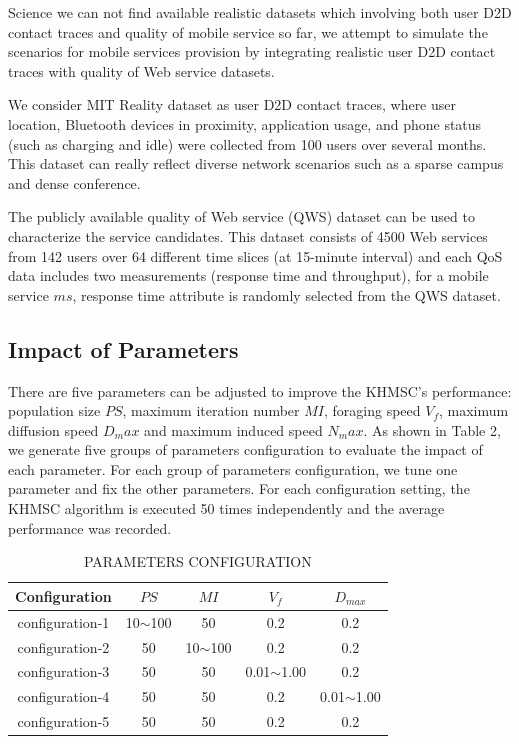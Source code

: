 \documentclass[10pt,journal,compsoc]{IEEEtran}
\begin{document}
Science we can not find available realistic datasets which involving both user D2D contact traces and quality of mobile service so far, we attempt to simulate the scenarios for mobile services provision by integrating realistic user D2D contact traces with quality of Web service datasets. 

We consider MIT Reality dataset as user D2D contact traces, where user location, Bluetooth devices in proximity, application usage, and phone status (such as charging and idle) were collected from 100 users over several months. This dataset can really reflect diverse network scenarios such as a sparse campus and dense conference.

The publicly available quality of Web service (QWS) dataset\cite{zheng2014investigating} can be used to characterize the service candidates. This dataset consists of 4500 Web services from 142 users over 64 different time slices (at 15-minute interval) and each QoS data includes two measurements (response time and throughput), for a mobile service $ms$, response time attribute is randomly selected from the QWS dataset. 

\subsection{Impact of Parameters}
There are five parameters can be adjusted to improve the KHMSC's performance: population size $PS$, maximum iteration number $MI$, foraging speed $V_f$, maximum diffusion speed $D_max$ and maximum induced speed $N_max$. As shown in Table 2, we generate five groups of parameters configuration to evaluate the impact of each parameter. For each group of parameters configuration, we tune one parameter and fix the other parameters. For each configuration setting, the KHMSC algorithm is executed 50 times independently and the average performance was recorded.

\begin{table}[!t]
\renewcommand{\arraystretch}{1.3}
\caption{PARAMETERS CONFIGURATION}
\label{table_example}
\centering
\begin{tabular}{ccccc}
\hline
\bfseries Configuration & \bfseries $PS$ & \bfseries $MI$ & \bfseries $V_f$ & \bfseries $D_{max}$  \\
\hline
configuration-1 & 10$\sim$100 & 50          & 0.2            & 0.2            \\
configuration-2 & 50          & 10$\sim$100 & 0.2            & 0.2            \\
configuration-3 & 50          & 50          & 0.01$\sim$1.00 & 0.2            \\
configuration-4 & 50          & 50          & 0.2            & 0.01$\sim$1.00 \\
configuration-5 & 50          & 50          & 0.2            & 0.2            \\
\hline
\end{tabular}
\end{table}
\end{document}

